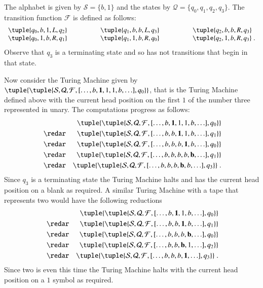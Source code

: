 \documentclass[submission,copyright,creativecommons]{eptcs}
\newcommand{\tmach}[1]{\tuple{\tuple{#1}}}
\newcommand{\tape}[1]{[#1]}
\begin{document}
The alphabet is given by ${\mathcal S}=\{b,1\}$ and the states by
${\mathcal Q}=\{q_0,q_1,q_2,q_3\}$.
The transition function ${\mathcal F}$ is defined as follows:
\begin{equation*}
\begin{array}{c}
\tuple{q_0,b,1,L,q_2}\\
\tuple{q_0,1,b,R,q_1}
\end{array}
\qquad\qquad
\begin{array}{c}
\tuple{q_1,b,b,L,q_3}\\
\tuple{q_1,1,b,R,q_0}
\end{array}
\qquad\qquad
\begin{array}{c}
\tuple{q_2,b,b,R,q_3}\ \ \\
\tuple{q_2,1,b,R,q_3}\; .
\end{array}
\end{equation*}
Observe that $q_3$ is a terminating state and so has not transitions that
begin in that state.

Now consider the Turing Machine given by
$\tmach{{\mathcal S}, {\mathcal Q}, {\mathcal F}, \tape{\ldots,b,{\bf 1},1,1,b,\ldots}, q_0}$, that is
the Turing Machine defined above with the current head position on the first $1$ of the
number three represented in unary.
The computations progress as follows:
\begin{eqnarray*}
\ &\ &\tmach{{\mathcal S}, {\mathcal Q}, {\mathcal F}, \tape{\ldots,b,{\bf 1},1,1,b,\ldots}, q_0}\\
&\redar&\tmach{{\mathcal S}, {\mathcal Q}, {\mathcal F}, \tape{\ldots,b,b,{\bf 1},1,b,\ldots}, q_1}\\
&\redar&\tmach{{\mathcal S}, {\mathcal Q}, {\mathcal F}, \tape{\ldots,b,b,b,{\bf 1},b,\ldots}, q_0}\\
&\redar&\tmach{{\mathcal S}, {\mathcal Q}, {\mathcal F}, \tape{\ldots,b,b,b,b,{\bf b},\ldots}, q_1}\\
&\redar&\tmach{{\mathcal S}, {\mathcal Q}, {\mathcal F}, \tape{\ldots,b,b,b,{\bf b},b,\ldots}, q_3}\; .
\end{eqnarray*}
Since $q_3$ is a terminating state the Turing Machine halts and has the current head position on a
blank as required.
A similar Turing Machine with a tape that represents two would have the following reductions
\begin{eqnarray*}
\ &\ &\tmach{{\mathcal S}, {\mathcal Q}, {\mathcal F}, \tape{\ldots,b,{\bf 1},1,b,\ldots}, q_0}\\
&\redar&\tmach{{\mathcal S}, {\mathcal Q}, {\mathcal F}, \tape{\ldots,b,b,{\bf 1},b,\ldots}, q_1}\\
&\redar&\tmach{{\mathcal S}, {\mathcal Q}, {\mathcal F}, \tape{\ldots,b,b,b,{\bf b},\ldots}, q_0}\\
&\redar&\tmach{{\mathcal S}, {\mathcal Q}, {\mathcal F}, \tape{\ldots,b,b,{\bf b},1,\ldots}, q_2}\\
&\redar&\tmach{{\mathcal S}, {\mathcal Q}, {\mathcal F}, \tape{\ldots,b,b,b,{\bf 1},\ldots}, q_3}\; .
\end{eqnarray*}
Since two is even this time the Turing Machine halts with the current head position on a $1$ symbol
as required.
\end{document}
